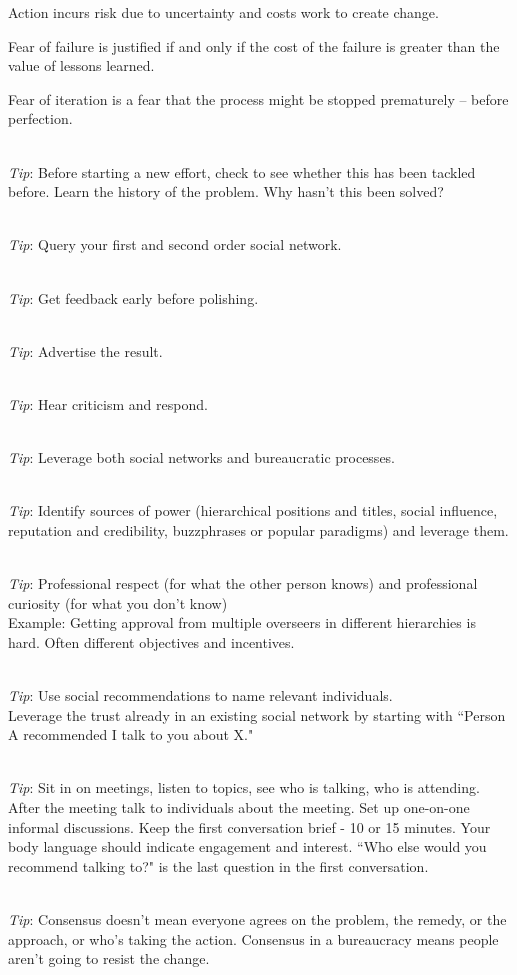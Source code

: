 Action incurs risk due to uncertainty and costs work to create change.

Fear of failure is justified if and only if the cost of the failure is greater than the value of lessons learned.

Fear of iteration is a fear that the process might be stopped prematurely -- before perfection.

\ \\
\textit{Tip}: Before starting a new effort, check to see whether this has been tackled before.
Learn the history of the problem. Why hasn't this been solved?

\ \\
\textit{Tip}: Query your first and second order social network.

\ \\
\textit{Tip}: Get feedback early before polishing.

\ \\
\textit{Tip}: Advertise the result.

\ \\
\textit{Tip}: Hear criticism and respond.

\ \\
\textit{Tip}: Leverage both social networks and bureaucratic processes. 

\ \\
\textit{Tip}: Identify sources of power (hierarchical positions and titles, social influence, reputation and credibility, buzzphrases or popular paradigms) and leverage them.

\ \\
\textit{Tip}: Professional respect (for what the other person knows) and professional curiosity (for what you don't know) \\
Example: Getting approval from multiple overseers in different hierarchies is hard. Often different objectives and incentives.


\ \\
\textit{Tip}: Use social recommendations to name relevant individuals.\\
Leverage the trust already in an existing social network by starting with ``Person A recommended I talk to you about X."


\ \\
\textit{Tip}: Sit in on meetings, listen to topics, see who is talking, who is attending. After the meeting talk to individuals about the meeting. Set up one-on-one informal discussions. Keep the first conversation  brief - 10 or 15 minutes. Your body language should indicate engagement and interest. ``Who else would you recommend talking to?" is the last question in the first conversation.

\ \\
\textit{Tip}: Consensus doesn't mean everyone agrees on the problem, the remedy, or the approach, or who's taking the action. Consensus in a bureaucracy means people aren't going to resist the change.